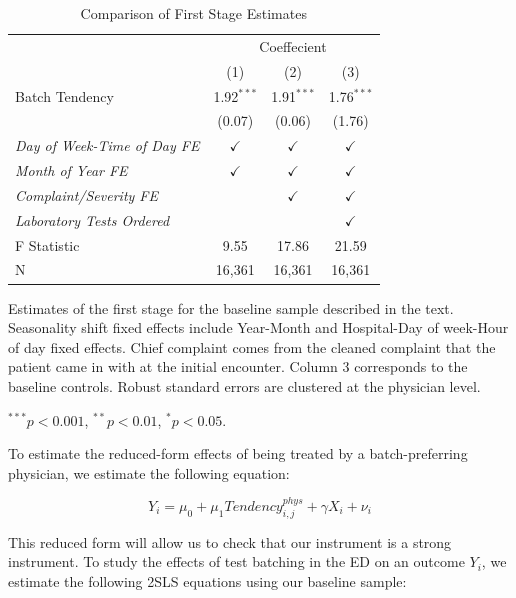 \documentclass{article}
\begin{document}
\begin{table}[!htbp] \centering 
  \caption{Comparison of First Stage Estimates}
  \label{table:first_stage}
  \begin{tabularx}{5.5in}{Xccc} %
  \toprule
   & \multicolumn{3}{c}{Coeffecient} \\
  \cmidrule{2-4}
   & (1) & (2) & (3) \\
  \midrule
  Batch Tendency & 1.92$^{***}$ & 1.91$^{***}$ & 1.76$^{***}$ \\ 
   & (0.07) & (0.06) & (1.76) \\ 
  \textit{Day of Week-Time of Day FE} & $\checkmark$ & $\checkmark$ & $\checkmark$ \\
  \textit{Month of Year FE} & $\checkmark$ & $\checkmark$ & $\checkmark$ \\
  \textit{Complaint/Severity FE} & & $\checkmark$ & $\checkmark$ \\
  \textit{Laboratory Tests Ordered} & & & $\checkmark$ \\
  \midrule
  F Statistic & 9.55 & 17.86 & 21.59 \\ 
  N & 16,361 & 16,361 & 16,361 \\ 
  \bottomrule
  \end{tabularx}
  \begin{tablenotes}
  \small
  \item Estimates of the first stage for the baseline sample described in the text. Seasonality shift fixed effects include Year-Month and Hospital-Day of week-Hour of day fixed effects. Chief complaint comes from the cleaned complaint that the patient came in with at the initial encounter. Column 3 corresponds to the baseline controls. Robust standard errors are clustered at the physician level.
  \item $^{***} p < 0.001$, $^{**} p < 0.01$, $^{*} p < 0.05$.
  \end{tablenotes}
\end{table}

To estimate the reduced-form effects of being treated by a
batch-preferring physician, we estimate the following equation:

\begin{equation}
Y_i = \mu_0 + \mu_1 Tendency_{i,j}^{phys} + \gamma X_i + \nu_i
\end{equation}

This reduced form will allow us to check that our instrument is a strong
instrument. To study the effects of test batching in the ED on an
outcome \(Y_i\), we estimate the following 2SLS equations using our
baseline sample:
\end{document}
